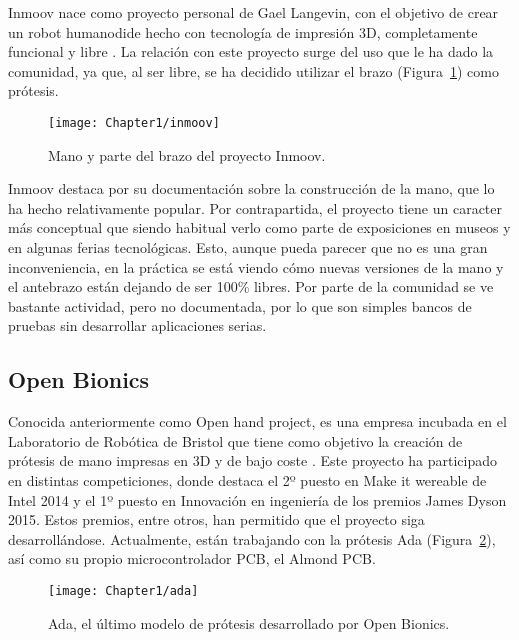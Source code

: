 Inmoov nace como proyecto personal de Gael Langevin, con el objetivo de crear
un robot humanodide hecho con tecnología de impresión 3D, completamente
funcional y libre \cite{langevin2014inmoov}. La relación con este proyecto surge
del uso que le ha dado la comunidad, ya que, al ser libre, se ha decidido utilizar
el brazo (Figura~\ref{fig:inmoov}) como prótesis.

\begin{figure}[htp]
  \centering
    \texttt{[image: Chapter1/inmoov]}
  \caption{Mano y parte del brazo del proyecto Inmoov.}
\label{fig:inmoov}
\end{figure}

Inmoov destaca por su documentación sobre la construcción de la mano, que lo ha hecho
relativamente popular. Por contrapartida, el proyecto tiene un caracter
más conceptual que %
siendo habitual verlo como parte de exposiciones en museos y en algunas ferias
tecnológicas. Esto, aunque pueda parecer que no es una gran inconveniencia, en
la práctica se está viendo cómo nuevas versiones de la mano y el antebrazo están
dejando de ser 100\% libres. Por parte de la comunidad se ve bastante
actividad, pero no documentada, por lo que son simples bancos de pruebas sin desarrollar
aplicaciones serias.



\subsection{Open Bionics}
\label{sub:open-bionic}

Conocida anteriormente como Open hand project, es una empresa incubada en el
Laboratorio de Robótica de Bristol que tiene como objetivo la creación de
prótesis de mano impresas en 3D y de bajo coste \cite{remenyi2015innovation}.
Este proyecto ha participado en distintas competiciones, donde destaca
el 2º puesto en Make it wereable de Intel 2014 y el 1º puesto en Innovación en
ingeniería
de los premios James Dyson 2015. Estos premios, entre otros, han permitido
que el proyecto siga desarrollándose. Actualmente, están trabajando
con la prótesis Ada (Figura~\ref{fig:ada}), así como su propio
microcontrolador PCB, el Almond PCB.



\begin{figure}[htp]
  \centering
    \texttt{[image: Chapter1/ada]}
  \caption{Ada, el último modelo de prótesis desarrollado por Open Bionics.}
\label{fig:ada}
\end{figure}


